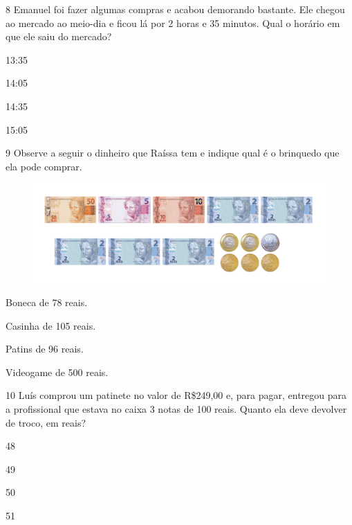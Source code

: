 \num{8} Emanuel foi fazer algumas compras e acabou demorando bastante. Ele chegou ao mercado ao meio-dia e ficou lá por 2 horas e 35 minutos. Qual
o horário em que ele saiu do mercado?

\begin{escolha}
\item 13:35

\item 14:05

\item 14:35

\item 15:05
\end{escolha}

\pagebreak
\num{9} Observe a seguir o dinheiro que Raíssa tem e indique qual é o brinquedo que ela pode comprar.

\begin{figure}[htpb!]
\includegraphics[width=\textwidth]{./media/image156.png}
\end{figure}

\begin{escolha}
\item Boneca de 78 reais.

\item Casinha de 105 reais.

\item Patins de 96 reais.

\item Videogame de 500 reais.
\end{escolha}

\num{10} Luís comprou um patinete no valor de R\$249,00 e, para pagar, entregou
para a profissional que estava no caixa 3 notas de 100 reais. Quanto ela deve devolver de troco, em reais?

\begin{escolha}
\item 48

\item 49

\item 50

\item 51
\end{escolha}

